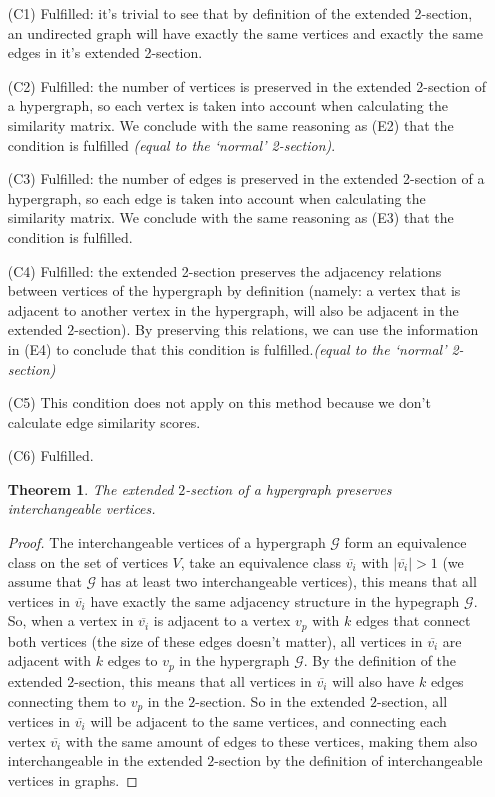 \documentclass[a4paper,11pt]{report}
\newtheorem{theorem}{Theorem}[section]
\newcommand{\hgraf}{\mathcal{G}}
\begin{document}
\begin{itemize}
  \item[(C1)] Fulfilled: it's trivial to see that by definition of the extended 2-section, an undirected 
  graph will have exactly the same vertices and exactly the same edges in it's
  extended 2-section.
    \item[(C2)] Fulfilled: the number of vertices is preserved in the extended 2-section of 
  a hypergraph, so each vertex is taken into account when calculating the 
  similarity matrix. We conclude with the same reasoning as (E2) that the 
  condition is fulfilled \textit{(equal to the `normal' 2-section)}.    
  \item[(C3)]  Fulfilled: the number of edges is preserved in the extended 2-section of 
  a hypergraph, so each edge is taken into account when calculating the 
  similarity matrix. We conclude with the same reasoning as (E3) that the 
  condition is fulfilled.
  \item[(C4)] Fulfilled: the extended 2-section preserves the adjacency relations between 
  vertices of the hypergraph by definition (namely: a vertex that is adjacent to another vertex in the hypergraph, will also be adjacent in the extended $2$-section). By preserving this relations, we can 
  use the information in (E4) to conclude that this condition is fulfilled.\textit{(equal to the `normal' 2-section)}
  \item[(C5)]   This condition does not apply on this method because we don't calculate edge similarity scores.

  \item[(C6)] Fulfilled. \begin{theorem}
   The extended $2$-section of a hypergraph preserves interchangeable vertices.
  \end{theorem}
 \begin{proof}
   The interchangeable vertices of a hypergraph $\hgraf$ form an equivalence class on the set of vertices
   $V$, take an equivalence class $\overline{v_i}$ with $|\overline{v_i}| > 1$ (we assume that $\hgraf$ has at least two interchangeable vertices),
   this means that all vertices in $\overline{v_i}$ have exactly the same adjacency structure in the hypegraph $\hgraf$.  
   So, when a vertex in $\overline{v_i}$ is adjacent to a vertex $v_p$ with $k$ edges that connect both vertices (the size of these
   edges doesn't matter), all 
   vertices in $\overline{v_i}$ are adjacent with $k$ edges to $v_p$ in the hypergraph 
   $\hgraf$. By the definition of the extended $2$-section, this means that all vertices 
   in $\overline{v_i}$ will also have $k$ edges connecting them to $v_p$ in the 
   $2$-section. So in the extended $2$-section, all vertices in $\overline{v_i}$ will be adjacent to 
  the same vertices, and connecting each vertex $\overline{v_i}$ with the same amount of edges to these vertices, making them also
   interchangeable in the extended $2$-section by the definition of interchangeable vertices in graphs.   
   

\end{proof}
\end{itemize}
\end{document}
